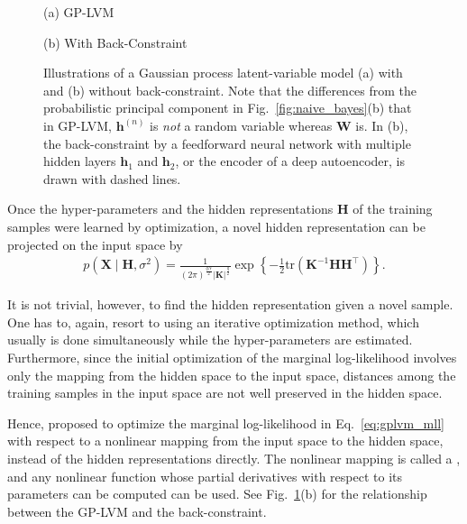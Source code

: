 \documentclass{now}
\newcommand{\vect}[1]{\mathbf{#1}}
\newcommand{\matr}[1]{\mathbf{#1}}
\newcommand{\vh}[0]{\vect{h}}
\newcommand{\mW}[0]{\matr{W}}
\newcommand{\mX}[0]{\matr{X}}
\newcommand{\mK}[0]{\matr{K}}
\newcommand{\mH}[0]{\matr{H}}
\begin{document}
\begin{figure}[t]
    \vspace{2mm}
    \begin{minipage}{0.48\textwidth}
        \centering
        \small
        (a) GP-LVM
    \end{minipage}
    \begin{minipage}{0.48\textwidth}
        \centering
        \small
        (b) With Back-Constraint
    \end{minipage}
    \caption{
        Illustrations of a Gaussian process latent-variable model (a) with and
        (b) without back-constraint. Note that the differences from the
        probabilistic principal component in Fig.~\ref{fig:naive_bayes}(b) that
        in GP-LVM, $\vh^{(n)}$ is \textit{not} a random variable whereas $\mW$
        is. In (b), the back-constraint by a feedforward neural network with
        multiple hidden layers $\vh_1$ and $\vh_2$, or the encoder of a deep
        autoencoder, is drawn with dashed lines.
    }
    \label{fig:gplvm}
\end{figure}

Once the hyper-parameters and the hidden representations $\mH$ of
the training samples were learned by optimization, a novel hidden
representation can be projected on the input space by 
\begin{align*}
    p(\mX \mid \mH, \sigma^2) = \frac{1}{(2\pi)^{\frac{qN}{2}}
    \left| \mK \right|^{\frac{q}{2}}} \exp \left\{
    -\frac{1}{2} \text{tr} (\mK^{-1} \mH \mH^\top) \right\}.
\end{align*}

It is not trivial, however, to find the hidden representation
given a novel sample. One has to, again, resort to using an
iterative optimization method, which usually is done
simultaneously while the hyper-parameters are estimated.
Furthermore, since the initial optimization of the marginal
log-likelihood involves only the mapping from the hidden
space to the input space, distances among the training
samples in the input space are not well preserved in the
hidden space.

Hence, \citet{Lawrence2006} proposed to optimize the marginal log-likelihood in
Eq.~\eqref{eq:gplvm_mll} with respect to a nonlinear mapping from the input
space to the hidden space, instead of the hidden representations directly. The
nonlinear mapping is called a , and any nonlinear function
whose partial derivatives with respect to its parameters can be computed can be
used. See Fig.~\ref{fig:gplvm}(b) for the relationship between the GP-LVM and
the back-constraint.
\end{document}
